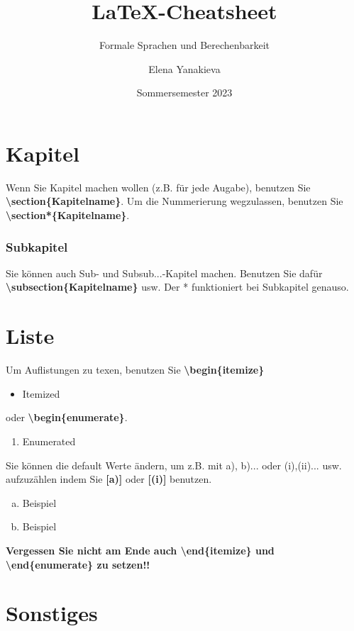 \documentclass[a4paper]{scrartcl}
\title{LaTeX-Cheatsheet}
\subtitle{Formale Sprachen und Berechenbarkeit}
\author{Elena Yanakieva}
\date{Sommersemester 2023}
\begin{document}
\maketitle


\section*{Kapitel}
Wenn Sie Kapitel machen wollen (z.B. für jede Augabe), benutzen Sie \textbf{\textbackslash section\{Kapitelname\}}.
Um die Nummerierung wegzulassen, benutzen Sie \textbf{\textbackslash section*\{Kapitelname\}}. 
\subsubsection*{Subkapitel}
Sie können auch Sub- und Subsub...-Kapitel machen. Benutzen Sie dafür \textbf{\textbackslash subsection\{Kapitelname\}} usw. Der * funktioniert bei Subkapitel genauso.

\section*{Liste}
Um Auflistungen zu texen, benutzen Sie \textbf{\textbackslash begin\{itemize\}}

\begin{itemize}
    \item Itemized
\end{itemize}

oder \textbf{\textbackslash begin\{enumerate\}}. 

\begin{enumerate}
    \item Enumerated
\end{enumerate}

Sie können die default Werte ändern, um z.B. mit a), b)... oder (i),(ii)... usw. aufzuzählen indem Sie \textbf{[a)]} oder \textbf{[(i)]} benutzen.

\begin{enumerate} [a)]
    \item Beispiel
    \item Beispiel
\end{enumerate}

\noindent \textbf{Vergessen Sie nicht am Ende auch \textbf{\textbackslash end\{itemize\}} und \textbf{\textbackslash end\{enumerate\}} zu setzen!!}

\section*{Sonstiges}
\end{document}
